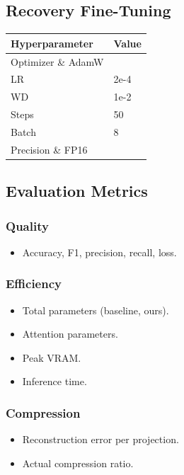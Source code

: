 \subsection{Recovery Fine-Tuning}

\begin{table}[H]
\centering
\small
\begin{tabular}{ll}
\toprule
\textbf{Hyperparameter} & \textbf{Value} \\
\midrule
Optimizer \& AdamW \\
LR & 2e-4 \\
WD & 1e-2 \\
Steps & 50 \\
Batch & 8 \\
Precision \& FP16 \\
\bottomrule
\end{tabular}
\end{table}

\subsection{Evaluation Metrics}

\subsubsection{Quality}
\begin{itemize}
\item Accuracy, F1, precision, recall, loss.

\end{itemize}
\subsubsection{Efficiency}
\begin{itemize}
\item Total parameters (baseline, ours).
\item Attention parameters.
\item Peak VRAM.
\item Inference time.

\end{itemize}
\subsubsection{Compression}
\begin{itemize}
\item Reconstruction error per projection.
\item Actual compression ratio.

\end{itemize}
